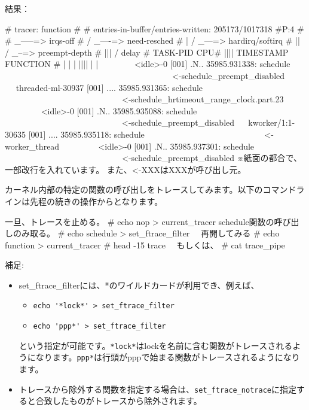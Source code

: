 \documentclass[mingoth,a4paper]{jsarticle}
\begin{document}
結果：
 \begin{commandline}
# tracer: function
#
# entries-in-buffer/entries-written: 205173/1017318   #P:4
#
#                              _-----=> irqs-off
#                             / _----=> need-resched
#                            | / _---=> hardirq/softirq
#                            || / _--=> preempt-depth
#                            ||| /     delay
#           TASK-PID   CPU#  ||||    TIMESTAMP  FUNCTION
#              | |       |   ||||       |         |
   　　　　<idle>-0     [001] .N.. 35985.931338: schedule
   　　　　　　　　　　　　　　　　　　　　<-schedule_preempt_disabled
   　    threaded-ml-30937 [001] .... 35985.931365: schedule
   　　　　　　　　　　　　　　<-schedule_hrtimeout_range_clock.part.23
　　　　   <idle>-0     [001] .N.. 35985.935088: schedule
   　　　　　　　　　　　　　　<-schedule_preempt_disabled
　   kworker/1:1-30635 [001] .... 35985.935118: schedule
   　　　　　　　　　　　　　　<-worker_thread
 　　　　  <idle>-0    [001] .N.. 35985.937301: schedule
   　　　　　　　　　　　　　　<-schedule_preempt_disabled
※紙面の都合で、一部改行を入れています。 また、<-XXXはXXXが呼び出し元。
 \end{commandline}   

 カーネル内部の特定の関数の呼び出しをトレースしてみます。以下のコマンドラインは先程の続きの操作からとなります。
 \begin{commandline}
 一旦、トレースを止める。
 # echo nop > current_tracer
 schedule関数の呼び出しのみ取る。
 # echo schedule > set_ftrace_filter
　再開してみる
 # echo function > current_tracer
 # head -15 trace　
   もしくは、
 # cat trace_pipe
 \end{commandline}   

 補足:
\begin{itemize}
 \item set\_ftrace\_filterには、*のワイルドカードが利用でき、例えば、
   \begin{itemize}
   \item \verb+echo '*lock*' > set_ftrace_filter+
   \item \verb+echo 'ppp*' > set_ftrace_filter+     
   \end{itemize}
   という指定が可能です。\verb+*lock*+はlockを名前に含む関数がトレースされるようになります。\verb+ppp*+は行頭がpppで始まる関数がトレースされるようになります。
 \item トレースから除外する関数を指定する場合は、\verb+set_ftrace_notrace+に指定すると合致したものがトレースから除外されます。
\end{itemize}
\end{document}

